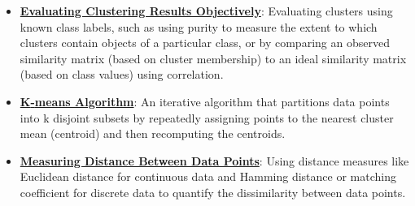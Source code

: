 \documentclass{article}%
\begin{document}
\begin{itemize}[leftmargin=*]
\item \href{https://purdue.brightspace.com/d2l/common/assets/pdfjs-d2l-dist/1.0.14-legacy/web/viewer.html?file=%2Fcontent%2Fenforced%2F1095467-wl.202510.CS.24300.001%2F12L2-distance-clusters.pdf%3Fou%3D1095467&lang=en-us&container=d2l-fileviewer-rendered-pdf&fullscreen=d2l-fileviewer-rendered-pdf-dialog&height=667#page=43}{\textbf{Evaluating Clustering Results Objectively}}: Evaluating clusters using known class labels, such as using purity to measure the extent to which clusters contain objects of a particular class, or by comparing an observed similarity matrix (based on cluster membership) to an ideal similarity matrix (based on class values) using correlation.%
\item \href{https://purdue.brightspace.com/d2l/common/assets/pdfjs-d2l-dist/1.0.14-legacy/web/viewer.html?file=%2Fcontent%2Fenforced%2F1095467-wl.202510.CS.24300.001%2F12L2-distance-clusters.pdf%3Fou%3D1095467&lang=en-us&container=d2l-fileviewer-rendered-pdf&fullscreen=d2l-fileviewer-rendered-pdf-dialog&height=667#page=22}{\textbf{K{-}means Algorithm}}: An iterative algorithm that partitions data points into k disjoint subsets by repeatedly assigning points to the nearest cluster mean (centroid) and then recomputing the centroids.%
\item \href{https://purdue.brightspace.com/d2l/common/assets/pdfjs-d2l-dist/1.0.14-legacy/web/viewer.html?file=%2Fcontent%2Fenforced%2F1095467-wl.202510.CS.24300.001%2F12L2-distance-clusters.pdf%3Fou%3D1095467&lang=en-us&container=d2l-fileviewer-rendered-pdf&fullscreen=d2l-fileviewer-rendered-pdf-dialog&height=667#page=17}{\textbf{Measuring Distance Between Data Points}}: Using distance measures like Euclidean distance for continuous data and Hamming distance or matching coefficient for discrete data to quantify the dissimilarity between data points.%
\end{itemize}%
\end{document}
